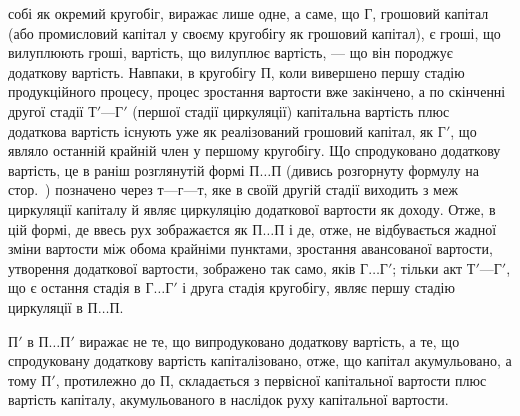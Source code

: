 \parcont{}  %
собі як окремий кругобіг, виражає лише одне, а саме, що $Г$, грошовий
капітал (або промисловий капітал у своєму кругобігу як грошовий
капітал), є гроші, що вилуплюють гроші, вартість, що вилуплює вартість,
— що він породжує додаткову вартість. Навпаки, в кругобігу $П$,
коли вивершено першу стадію продукційного процесу, процес зростання
вартости вже закінчено, а по скінченні другої стадії $Т' — Г'$ (першої
стадії циркуляції) капітальна вартість плюс додаткова вартість існують
уже як реалізований грошовий капітал, як $Г'$, що являло останній крайній
член у першому кругобігу. Що спродуковано додаткову вартість, це в
раніш розглянутій формі $П\dots{}П$ (дивись розгорнуту формулу на стор.~\pageref{original-41})
позначено через $т — г — т$, яке в своїй другій стадії виходить
з меж циркуляції капіталу й являє циркуляцію додаткової вартости як
доходу. Отже, в цій формі, де ввесь рух зображаєтся як $П\dots{} П$ і де,
отже, не відбувається жадної зміни вартости між обома крайніми пунктами,
зростання авансованої вартости, утворення додаткової вартости, зображено
так само, яків $Г\dots{} Г'$; тільки акт $Т' — Г'$, що є остання стадія в $Г\dots{} Г'$
і друга стадія кругобігу, являє першу стадію циркуляції в $П\dots{}П$.

$П'$ в $П\dots{}П'$ виражає не те, що випродуковано додаткову вартість, а
те, що спродуковану додаткову вартість капіталізовано, отже, що капітал
акумульовано, а тому $П'$, протилежно до $П$, складається з первісної капітальної
вартости плюс вартість капіталу, акумульованого в наслідок руху
капітальної вартости.

